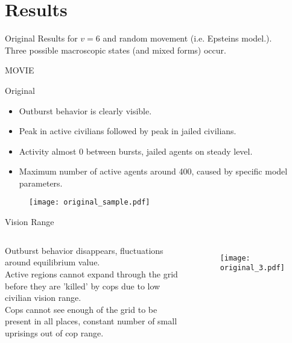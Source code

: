 \documentclass[red]{beamer}
\begin{document}
\section{Results}

\begin{frame}{Original}
  Results for $v = 6$ and random movement (i.e. Epsteins model.). \\
  Three possible macroscopic states (and mixed forms) occur.
  \vspace{10pt}
  \begin{center}
    MOVIE
  \end{center}

  \begin{figure}[H]
    \centering
    \label{fig:sample}
  \end{figure}
\end{frame}

\begin{frame}{Original}
  \begin{itemize}
  \item
    Outburst behavior is clearly visible.
  \item
    Peak in active civilians followed by peak in jailed civilians.
  \item
    Activity almost 0 between bursts, jailed agents on steady level.
  \item
    Maximum number of active agents around 400, caused by specific model parameters.
  \end{itemize}
  \begin{figure}[H]
    \centering
    \texttt{[image: original\_sample.pdf]}
    \label{fig:6}
  \end{figure}

\end{frame}

\begin{frame}{Vision Range}
  \begin{columns}
    \column{2.0in}
    Outburst behavior disappears, fluctuations around equilibrium value. \\
    Active regions cannot expand through the grid before they are 'killed' by cops due to low civilian vision range. \\
    Cops cannot see enough of the grid to be present in all places, constant number of small uprisings out of cop range.

    \column{2.5in}
    \begin{figure}[H]
      \texttt{[image: original\_3.pdf]}
      \label{fig:3}
    \end{figure}
  \end{columns}
\end{frame}
\end{document}
